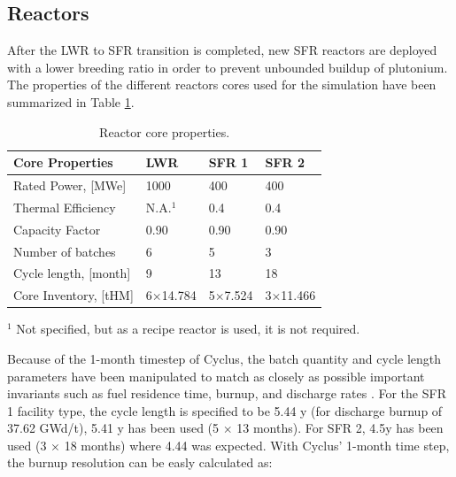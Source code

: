 \documentclass[12pt]{article}
\begin{document}
\subsection{Reactors}

After the LWR to SFR transition is completed, new SFR reactors are deployed
with a lower breeding ratio in order to prevent unbounded buildup of
plutonium. The properties of the different reactors cores used for the
simulation have been summarized in Table \ref{tab:reactor}.


\begin{table}[h!]
    \centering
    \begin{tabularx}{350pt}{lXXX}
    \hline
    Core Properties       &  LWR             &  SFR 1           &  SFR 2            \\
    \hline
    Rated Power, [MWe]    &  1000            &  400             &  400              \\
    Thermal Efficiency    &  N.A.$^1$        &  0.4             &  0.4              \\
    Capacity Factor       &  0.90            &  0.90            &  0.90             \\
    Number of batches     &  6               &  5               &  3                \\
    Cycle length, [month] &  9               &  13              &  18               \\
    Core Inventory, [tHM] &  6$\times$14.784 &  5$\times$7.524  &  3$\times$11.466  \\
    \hline
    \end{tabularx}
    \caption{Reactor core properties.}
    \label{tab:reactor}
    \footnotesize{$^1$ Not specified, but as a recipe reactor is used, it is not required.}
\end{table}




Because of the 1-month timestep of Cyclus, 
the batch quantity and cycle length parameters have been manipulated to match as
closely as possible important invariants such as fuel residence time, burnup,
and discharge rates \cite{B.Feng_calculation}.  For the SFR 1 facility type, the cycle
length is specified to be 5.44 y (for discharge burnup of 37.62 GWd/t), 5.41 y
has been used (5 $\times$ 13 months). For SFR 2, 4.5y has been used (3 $\times$ 18 months)
where 4.44 was expected.  With Cyclus' 1-month time step, the burnup resolution
can be easly calculated as:
\end{document}
